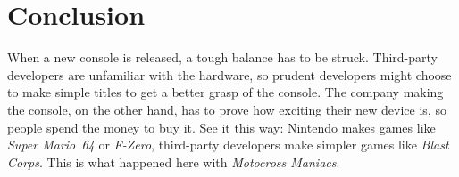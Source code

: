 \documentclass{book}
\begin{document}
\FloatBarrier\needspace{10mm}\section*{Conclusion}\nopagebreak[4]

When a new console is released, a tough balance has to be struck. Third-party developers are unfamiliar with the hardware, so prudent developers might choose to make simple titles to get a better grasp of the console. The company making the console, on the other hand, has to prove how exciting their new device is, so people spend the money to buy it. See it this way: Nintendo makes games like \emph{Super Mario 64} or \emph{F-Zero}, third-party developers make simpler games like \emph{Blast Corps}. This is what happened here with \emph{Motocross Maniacs}.
\end{document}
